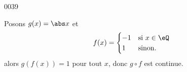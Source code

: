 
\begin{corrige}{0039}

Posons $g(x) = \abs x$ et
\begin{equation*}
  f(x) =
  \begin{cases}
    -1 & \text{si $x \in \eQ$}\\
    1 &  \text{sinon.}\\
  \end{cases}
\end{equation*}
alors $g(f(x)) = 1$ pour tout $x$, donc $g\circ f$ est continue.

\end{corrige}
